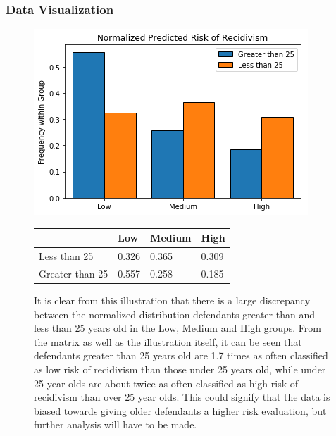 \documentclass[11pt, fleqn, titlepage]{article}
\begin{document}
	\subsubsection{Data Visualization}\label{age_data_visualization}
	
			\begin{figure}[H]
			\centering
			\includegraphics[width=0.5\linewidth]{imgs/normalized_recid_age}	
			\begin{table}[H]
				\centering
				\begin{tabular}{|l|l|l|l|}
					\hline
					& Low   & Medium & High  \\ \hline
					Less than 25    & 0.326 & 0.365  & 0.309 \\ \hline
					Greater than 25 & 0.557 & 0.258  & 0.185 \\ \hline
				\end{tabular}
			\end{table}
			\caption{It is clear from this illustration that there is a large discrepancy between the normalized distribution defendants greater than and less than 25 years old in the Low, Medium and High groups. From the matrix as well as the illustration itself, it can be seen that defendants greater than 25 years old are 1.7 times as often classified as low risk of recidivism than those under 25 years old, while under 25 year olds are about twice as often classified as high risk of recidivism than over 25 year olds. This could signify that the data is biased towards giving older defendants a higher risk evaluation, but further analysis will have to be made.}
			\label{fig:predictedrecidage}
		\end{figure}
	
\end{document}
